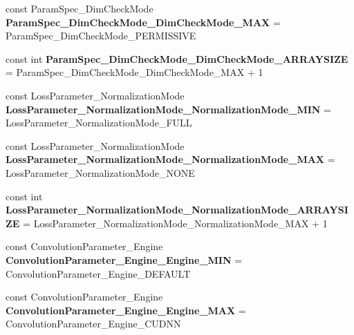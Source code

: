 \begin{DoxyCompactItemize}
\item 
\mbox{\label{namespacecaffe_ab3592e28735aa859aafb628903d73a56}} 
const Param\+Spec\+\_\+\+Dim\+Check\+Mode {\bfseries Param\+Spec\+\_\+\+Dim\+Check\+Mode\+\_\+\+Dim\+Check\+Mode\+\_\+\+M\+AX} = Param\+Spec\+\_\+\+Dim\+Check\+Mode\+\_\+\+P\+E\+R\+M\+I\+S\+S\+I\+VE
\item 
\mbox{\label{namespacecaffe_a2f557d4b8e48326a95396452720e9211}} 
const int {\bfseries Param\+Spec\+\_\+\+Dim\+Check\+Mode\+\_\+\+Dim\+Check\+Mode\+\_\+\+A\+R\+R\+A\+Y\+S\+I\+ZE} = Param\+Spec\+\_\+\+Dim\+Check\+Mode\+\_\+\+Dim\+Check\+Mode\+\_\+\+M\+AX + 1
\item 
\mbox{\label{namespacecaffe_ae3de832e94de90107e48a9fe7781fe83}} 
const Loss\+Parameter\+\_\+\+Normalization\+Mode {\bfseries Loss\+Parameter\+\_\+\+Normalization\+Mode\+\_\+\+Normalization\+Mode\+\_\+\+M\+IN} = Loss\+Parameter\+\_\+\+Normalization\+Mode\+\_\+\+F\+U\+LL
\item 
\mbox{\label{namespacecaffe_a12640581ecfd82357f4741198efe39d7}} 
const Loss\+Parameter\+\_\+\+Normalization\+Mode {\bfseries Loss\+Parameter\+\_\+\+Normalization\+Mode\+\_\+\+Normalization\+Mode\+\_\+\+M\+AX} = Loss\+Parameter\+\_\+\+Normalization\+Mode\+\_\+\+N\+O\+NE
\item 
\mbox{\label{namespacecaffe_a3298513531e4362265f82b4160143243}} 
const int {\bfseries Loss\+Parameter\+\_\+\+Normalization\+Mode\+\_\+\+Normalization\+Mode\+\_\+\+A\+R\+R\+A\+Y\+S\+I\+ZE} = Loss\+Parameter\+\_\+\+Normalization\+Mode\+\_\+\+Normalization\+Mode\+\_\+\+M\+AX + 1
\item 
\mbox{\label{namespacecaffe_aca61b2190c6b0a510badbaf6e09ca8ea}} 
const Convolution\+Parameter\+\_\+\+Engine {\bfseries Convolution\+Parameter\+\_\+\+Engine\+\_\+\+Engine\+\_\+\+M\+IN} = Convolution\+Parameter\+\_\+\+Engine\+\_\+\+D\+E\+F\+A\+U\+LT
\item 
\mbox{\label{namespacecaffe_a44823c725ec41e3d0f630d123bd30136}} 
const Convolution\+Parameter\+\_\+\+Engine {\bfseries Convolution\+Parameter\+\_\+\+Engine\+\_\+\+Engine\+\_\+\+M\+AX} = Convolution\+Parameter\+\_\+\+Engine\+\_\+\+C\+U\+D\+NN
\item 

\end{DoxyCompactItemize}
